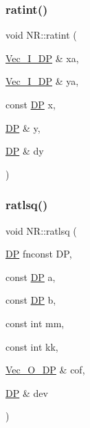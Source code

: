 \subsubsection{\texorpdfstring{ratint()}{ratint()}}
{\footnotesize\ttfamily void N\+R\+::ratint (\begin{DoxyParamCaption}\item[{\mbox{\hyperlink{namespaceNR_a9f943da53862537c552e2a770cb170ae}{Vec\+\_\+\+I\+\_\+\+DP}} \&}]{xa,  }\item[{\mbox{\hyperlink{namespaceNR_a9f943da53862537c552e2a770cb170ae}{Vec\+\_\+\+I\+\_\+\+DP}} \&}]{ya,  }\item[{const \mbox{\hyperlink{namespaceNR_af6ff762dd605ff477b8e52387253a02a}{DP}}}]{x,  }\item[{\mbox{\hyperlink{namespaceNR_af6ff762dd605ff477b8e52387253a02a}{DP}} \&}]{y,  }\item[{\mbox{\hyperlink{namespaceNR_af6ff762dd605ff477b8e52387253a02a}{DP}} \&}]{dy }\end{DoxyParamCaption})}

\mbox{\label{namespaceNR_a140701eacca3a2e031e077e8efc7794c}} 
\subsubsection{\texorpdfstring{ratlsq()}{ratlsq()}}
{\footnotesize\ttfamily void N\+R\+::ratlsq (\begin{DoxyParamCaption}\item[{\mbox{\hyperlink{namespaceNR_af6ff762dd605ff477b8e52387253a02a}{DP}} }]{fnconst DP,  }\item[{const \mbox{\hyperlink{namespaceNR_af6ff762dd605ff477b8e52387253a02a}{DP}}}]{a,  }\item[{const \mbox{\hyperlink{namespaceNR_af6ff762dd605ff477b8e52387253a02a}{DP}}}]{b,  }\item[{const int}]{mm,  }\item[{const int}]{kk,  }\item[{\mbox{\hyperlink{namespaceNR_a970094d23441f8ef6a45282a7eb2103d}{Vec\+\_\+\+O\+\_\+\+DP}} \&}]{cof,  }\item[{\mbox{\hyperlink{namespaceNR_af6ff762dd605ff477b8e52387253a02a}{DP}} \&}]{dev }\end{DoxyParamCaption})}

\mbox{\label{namespaceNR_a3acd42aca134502c65fb52c385218e33}} 
